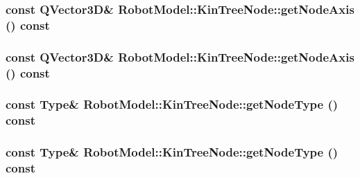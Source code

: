 \label{class_robot_model_1_1_kin_tree_node_a5c91c678cc74412ec298e61a39b47e3e}
\hypertarget{class_robot_model_1_1_kin_tree_node_af6a4b3bd148bf6aba766c367e13d59b6}{
\subsubsection[{getNodeAxis}]{\setlength{\rightskip}{0pt plus 5cm}const QVector3D\& RobotModel::KinTreeNode::getNodeAxis () const}}
\label{class_robot_model_1_1_kin_tree_node_af6a4b3bd148bf6aba766c367e13d59b6}
\hypertarget{class_robot_model_1_1_kin_tree_node_af6a4b3bd148bf6aba766c367e13d59b6}{
\subsubsection[{getNodeAxis}]{\setlength{\rightskip}{0pt plus 5cm}const QVector3D\& RobotModel::KinTreeNode::getNodeAxis () const}}
\label{class_robot_model_1_1_kin_tree_node_af6a4b3bd148bf6aba766c367e13d59b6}
\hypertarget{class_robot_model_1_1_kin_tree_node_aac3f58f3a0535b2983e2b328d9eee65a}{
\subsubsection[{getNodeType}]{\setlength{\rightskip}{0pt plus 5cm}const {\bf Type}\& RobotModel::KinTreeNode::getNodeType () const}}
\label{class_robot_model_1_1_kin_tree_node_aac3f58f3a0535b2983e2b328d9eee65a}
\hypertarget{class_robot_model_1_1_kin_tree_node_aac3f58f3a0535b2983e2b328d9eee65a}{
\subsubsection[{getNodeType}]{\setlength{\rightskip}{0pt plus 5cm}const {\bf Type}\& RobotModel::KinTreeNode::getNodeType () const}}
